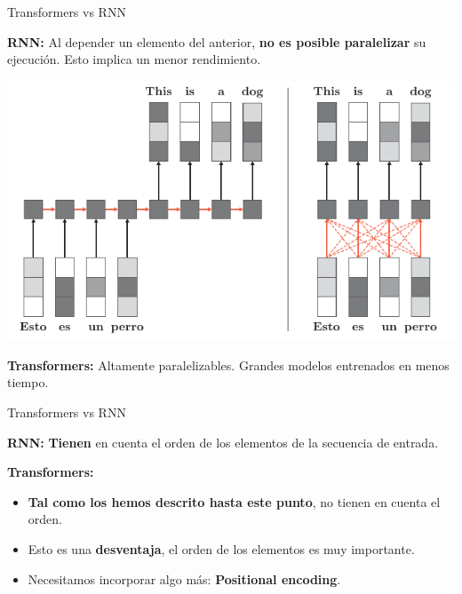 \documentclass[aspectratio=169]{beamer}
\begin{document}
\begin{frame}{Transformers vs RNN}
  \begin{block}{}
    \textbf{RNN:} Al depender un elemento del anterior, \textbf{no es posible paralelizar} su ejecución. Esto implica un menor rendimiento.
  \end{block}

  \includegraphics[width=.55\textwidth, center]{imgs/tema4/att/ATT_vs_RNN_2.pdf}
  
  \begin{block}{}
    \textbf{Transformers:} Altamente paralelizables. Grandes modelos entrenados en menos tiempo.
  \end{block}

\end{frame}
 
\begin{frame}{Transformers vs RNN}
  \begin{block}{}
    \textbf{RNN:} \textbf{Tienen} en cuenta el orden de los elementos de la secuencia de entrada.
  \end{block}
  \vspace{.5cm}
  \textbf{Transformers:}
  \begin{itemize}
    \item \textbf{Tal como los hemos descrito hasta este punto}, no tienen en cuenta el orden.
    \item Esto es una \textbf{desventaja}, el orden de los elementos es muy importante.
    \item Necesitamos incorporar algo más: \textbf{Positional encoding}.
  \end{itemize}
\end{frame}
\end{document}
